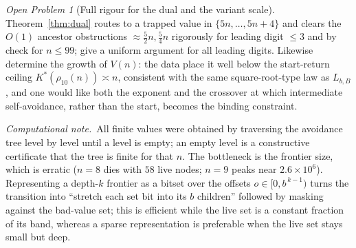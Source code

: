 \documentclass[11pt]{article}
\theoremstyle{plain}
\theoremstyle{definition}
\theoremstyle{remark}
\newtheorem{question}{Open Problem}
\newcommand{\Lbb}{L_{b,B}}
\begin{document}
\begin{question}[Full rigour for the dual and the variant scale]
Theorem~\ref{thm:dual} routes to a trapped value in $\{5n,\dots,5n+4\}$ and clears the $O(1)$ ancestor obstructions $\approx\tfrac52n,\tfrac54n$ rigorously for leading digit $\le3$ and by check for $n\le99$; give a uniform argument for all leading digits. Likewise determine the growth of $V(n)$: the data place it well below the start-return ceiling $K^{*}(\rho_{10}(n))\asymp n$, consistent with the same square-root-type law as $\Lbb$, and one would like both the exponent and the crossover at which intermediate self-avoidance, rather than the start, becomes the binding constraint.
\end{question}

\bigskip
\noindent\textit{Computational note.}\ All finite values were obtained by traversing the avoidance tree level by level until a level is empty; an empty level is a constructive certificate that the tree is finite for that $n$. The bottleneck is the frontier size, which is erratic ($n=8$ dies with $58$ live nodes; $n=9$ peaks near $2.6\times10^{6}$). Representing a depth-$k$ frontier as a bitset over the offsets $o\in[0,b^{\,k-1})$ turns the transition into ``stretch each set bit into its $b$ children'' followed by masking against the bad-value set; this is efficient while the live set is a constant fraction of its band, whereas a sparse representation is preferable when the live set stays small but deep.
\end{document}
